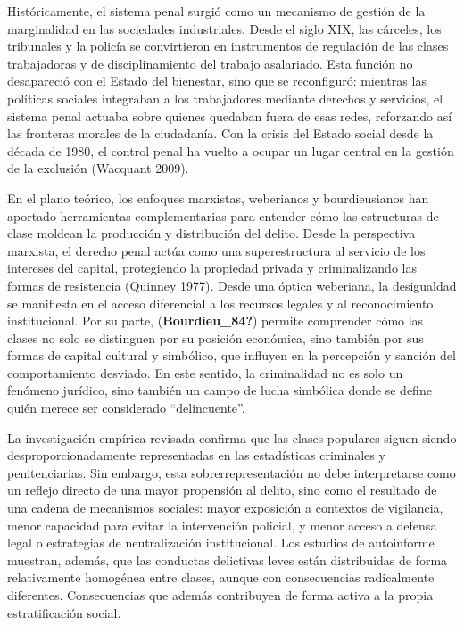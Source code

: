 \documentclass[
  spanish,
  letterpaper,
  DIV=11,
  numbers=noendperiod]{scrreprt}
\begin{document}
Históricamente, el sistema penal surgió como un mecanismo de gestión de
la marginalidad en las sociedades industriales. Desde el siglo XIX, las
cárceles, los tribunales y la policía se convirtieron en instrumentos de
regulación de las clases trabajadoras y de disciplinamiento del trabajo
asalariado. Esta función no desapareció con el Estado del bienestar,
sino que se reconfiguró: mientras las políticas sociales integraban a
los trabajadores mediante derechos y servicios, el sistema penal actuaba
sobre quienes quedaban fuera de esas redes, reforzando así las fronteras
morales de la ciudadanía. Con la crisis del Estado social desde la
década de 1980, el control penal ha vuelto a ocupar un lugar central en
la gestión de la exclusión (Wacquant 2009).

En el plano teórico, los enfoques marxistas, weberianos y bourdieusianos
han aportado herramientas complementarias para entender cómo las
estructuras de clase moldean la producción y distribución del delito.
Desde la perspectiva marxista, el derecho penal actúa como una
superestructura al servicio de los intereses del capital, protegiendo la
propiedad privada y criminalizando las formas de resistencia (Quinney
1977). Desde una óptica weberiana, la desigualdad se manifiesta en el
acceso diferencial a los recursos legales y al reconocimiento
institucional. Por su parte, (\textbf{Bourdieu\_84?}) permite comprender
cómo las clases no solo se distinguen por su posición económica, sino
también por sus formas de capital cultural y simbólico, que influyen en
la percepción y sanción del comportamiento desviado. En este sentido, la
criminalidad no es solo un fenómeno jurídico, sino también un campo de
lucha simbólica donde se define quién merece ser considerado
``delincuente''.

La investigación empírica revisada confirma que las clases populares
siguen siendo desproporcionadamente representadas en las estadísticas
criminales y penitenciarias. Sin embargo, esta sobrerrepresentación no
debe interpretarse como un reflejo directo de una mayor propensión al
delito, sino como el resultado de una cadena de mecanismos sociales:
mayor exposición a contextos de vigilancia, menor capacidad para evitar
la intervención policial, y menor acceso a defensa legal o estrategias
de neutralización institucional. Los estudios de autoinforme muestran,
además, que las conductas delictivas leves están distribuidas de forma
relativamente homogénea entre clases, aunque con consecuencias
radicalmente diferentes. Consecuencias que además contribuyen de forma
activa a la propia estratificación social.
\end{document}
